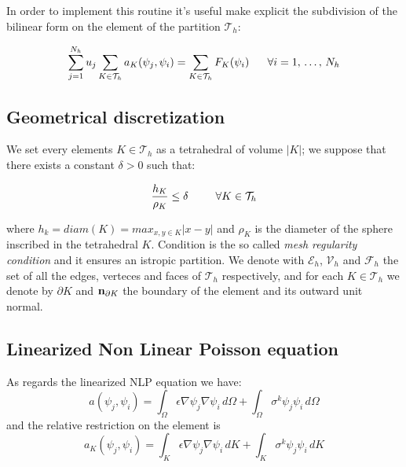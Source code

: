In order to implement this routine it's useful make explicit the subdivision of the bilinear form on the element of the partition $\mathcal{T}_h$:

\begin{equation}
\sum_{j=1}^{N_h}u_j\sum_{K\in \mathcal{T}_h}a_K(\psi_j,\psi_i) = \sum_{K\in \mathcal{T}_h}F_K(\psi_i) \psp{10} \forall i = 1, \, . \, . \, . \, , \, N_h
\end{equation}


\subsection{Geometrical discretization}

We set every elements $K\in \mathcal{T}_h$ as a tetrahedral of volume $|K|$; we suppose that there exists a constant $\delta>0$ such that:

\begin{equation}
\label{eq: mesh regular condition}
\dfrac{h_K}{\rho_K} \leq \delta \psp{15} \forall K \in \mathcal{T}_h
\end{equation}

where $h_k=diam(K)=max_{x,y\in K}|x-y|$ and $\rho_K$ is the diameter of the sphere inscribed in the tetrahedral $K$. Condition  is the so called \textit{mesh regularity condition} \cite{quarteroni:modnum} and it ensures an istropic partition.
We denote with $\mathcal{E}_h$, $\mathcal{V}_h$ and $\mathcal{F}_h$ the set of all the edges, verteces and faces  
of $\mathcal{T}_h$ respectively, and for each $K\in \mathcal{T}_h$ we denote by $\partial K$ and $\mathbf{n}_{\partial K}$ the boundary of the element and its outward unit normal.
  
 
 \subsection{Linearized Non Linear Poisson equation}

As regards the linearized NLP equation we have:
\begin{equation}
a(\psi_j,\psi_i)  = \int_{\Omega} \epsilon \nabla \psi_j \nabla \psi_i \, d\Omega + \int_{\Omega} \sigma^{k}\psi_j \psi_i \, d\Omega 
\end{equation}
and the relative restriction on the element is
\begin{equation}
\label{eq: bilinear local discrete}
a_K(\psi_j,\psi_i)  = \int_{K} \epsilon \nabla \psi_j \nabla \psi_i \, dK + \int_{K} \sigma^{k}\psi_j \psi_i \, dK
\end{equation}

